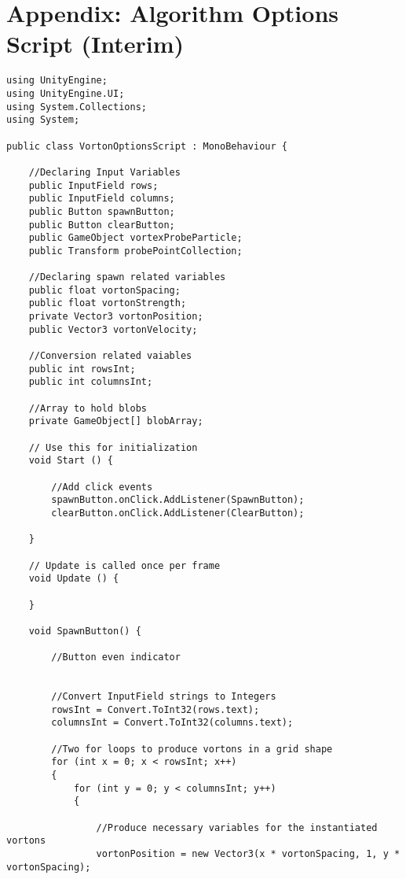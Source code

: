 \section{Appendix: Algorithm Options Script (Interim)}

\begin{mdframed}[linecolor=black, topline=true, bottomline=true,
  leftline=false, rightline=false]
\begin{verbatim}
using UnityEngine;
using UnityEngine.UI;
using System.Collections;
using System;

public class VortonOptionsScript : MonoBehaviour {

    //Declaring Input Variables
    public InputField rows;
    public InputField columns;
    public Button spawnButton;
    public Button clearButton;
    public GameObject vortexProbeParticle;
    public Transform probePointCollection;

    //Declaring spawn related variables
    public float vortonSpacing;
    public float vortonStrength;
    private Vector3 vortonPosition;
    public Vector3 vortonVelocity;

    //Conversion related vaiables
    public int rowsInt;
    public int columnsInt;

    //Array to hold blobs
    private GameObject[] blobArray;

    // Use this for initialization
    void Start () {

        //Add click events
        spawnButton.onClick.AddListener(SpawnButton);
        clearButton.onClick.AddListener(ClearButton);

    }
	
	// Update is called once per frame
	void Update () {

    }

    void SpawnButton() {

        //Button even indicator


        //Convert InputField strings to Integers
        rowsInt = Convert.ToInt32(rows.text);
        columnsInt = Convert.ToInt32(columns.text);

        //Two for loops to produce vortons in a grid shape
        for (int x = 0; x < rowsInt; x++)
        {
            for (int y = 0; y < columnsInt; y++)
            {

                //Produce necessary variables for the instantiated vortons
                vortonPosition = new Vector3(x * vortonSpacing, 1, y * vortonSpacing);


\end{verbatim}
\end{mdframed}
